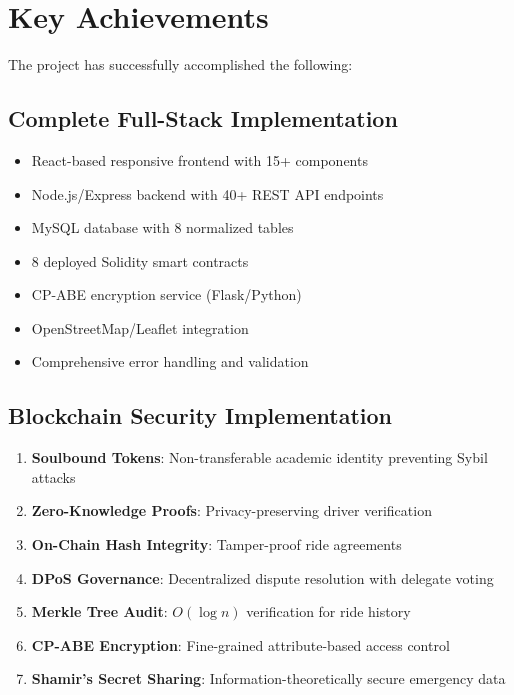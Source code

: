 \documentclass[12pt]{report}
\theoremstyle{plain}
\theoremstyle{definition}
\theoremstyle{remark}
\begin{document}
\section{Key Achievements}

The project has successfully accomplished the following:

\subsection{Complete Full-Stack Implementation}

\begin{itemize}
    \item React-based responsive frontend with 15+ components
    \item Node.js/Express backend with 40+ REST API endpoints
    \item MySQL database with 8 normalized tables
    \item 8 deployed Solidity smart contracts
    \item CP-ABE encryption service (Flask/Python)
    \item OpenStreetMap/Leaflet integration
    \item Comprehensive error handling and validation
\end{itemize}

\subsection{Blockchain Security Implementation}

\begin{enumerate}
    \item \textbf{Soulbound Tokens}: Non-transferable academic identity preventing Sybil attacks
    \item \textbf{Zero-Knowledge Proofs}: Privacy-preserving driver verification
    \item \textbf{On-Chain Hash Integrity}: Tamper-proof ride agreements
    \item \textbf{DPoS Governance}: Decentralized dispute resolution with delegate voting
    \item \textbf{Merkle Tree Audit}: $O(\log n)$ verification for ride history
    \item \textbf{CP-ABE Encryption}: Fine-grained attribute-based access control
    \item \textbf{Shamir's Secret Sharing}: Information-theoretically secure emergency data
\end{enumerate}
\end{document}
